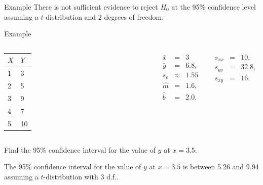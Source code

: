 \begin{frame}{Example}
      {
        There is {\color{red}not} sufficient evidence to reject $H_0$
        at the 95\% confidence level assuming a $t$-distribution and 2
        degrees of freedom.
      }


\end{frame}


\begin{frame}{Example}


    \begin{columns}

      \begin{tabular}{l|l}
        $X$ & $Y$ \\ \hline
        1 & 3 \\
        2 & 5  \\
        3 & 9 \\
        4 & 7  \\
        5 & 10
      \end{tabular}


      \begin{eqnarray*}
        \bar{x} & = & 3 \\
        \bar{y} & = & 6.8, \\
        s_e & \approx & 1.55 \\
        \hat{m} & = & 1.6, \\
        \hat{b} & = & 2.0.
      \end{eqnarray*}


      \begin{eqnarray*}
        s_{xx} & = & 10, \\
        s_{yy} & = & 32.8, \\
        s_{xy} & = & 16.
      \end{eqnarray*}

    \end{columns}


    \vfill 


      Find the 95\% confidence interval for the value of $y$ at $x=3.5$.

      {

        The 95\% confidence interval for the value of $y$ at $x=3.5$
        is between 5.26 and 9.94 assuming a $t$-distribution with 3 d.f..
      }


\end{frame}


